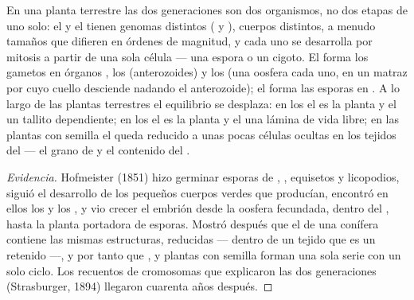 \begin{proposition}\label{prop:b2:plant-life-cycles:alternation}
En una planta terrestre las dos generaciones son dos organismos, no dos
etapas de uno solo: el  y el  tienen genomas
distintos ( y ), cuerpos distintos, a menudo tamaños que
difieren en órdenes de magnitud, y cada uno se desarrolla por mitosis a
partir de una sola célula --- una espora o un cigoto. El  forma
los gametos en órganos , los \emph{}
(anterozoides) y los \emph{} (una oosfera cada uno, en un
matraz por cuyo cuello desciende nadando el anterozoide); el
 forma las esporas en \emph{}. A lo largo de las
plantas terrestres el equilibrio se desplaza: en los  el 
es la planta y el  un tallito dependiente; en los  el
 es la planta y el  una lámina de vida libre; en las
plantas con semilla el  queda reducido a unas pocas células
ocultas en los tejidos del  --- el grano de  y el
contenido del .
\end{proposition}
\begin{proof}[Evidencia]
Hofmeister (1851) hizo germinar esporas de , , equisetos y
licopodios, siguió el desarrollo de los pequeños cuerpos verdes que
producían, encontró en ellos los  y los , y vio
crecer el embrión desde la oosfera fecundada, dentro del , hasta
la planta portadora de esporas. Mostró después que el  de una
conífera contiene las mismas estructuras, reducidas --- 
dentro de un tejido que es un  retenido ---, y por tanto que
,  y plantas con semilla forman una sola serie con un solo
ciclo. Los recuentos de cromosomas que explicaron las dos generaciones
(Strasburger, 1894) llegaron cuarenta años después.
\end{proof}

